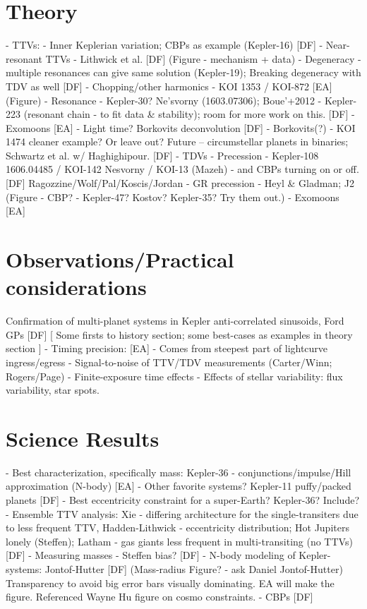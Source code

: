 \documentclass[graybox,natbib,nosecnum]{svmult}
\begin{document}
\section{Theory} %
  - TTVs:
    - Inner Keplerian variation;  CBPs as example (Kepler-16) [DF]
    - Near-resonant TTVs - Lithwick et al.  [DF] (Figure - mechanism + data)
       - Degeneracy - multiple resonances can give same solution (Kepler-19); Breaking degeneracy with TDV as well [DF]
    - Chopping/other harmonics - KOI 1353 / KOI-872 [EA] (Figure)
    - Resonance - Kepler-30?  Ne'svorny (1603.07306); Boue'+2012 - Kepler-223 (resonant chain - to fit data \& stability); room for more work on this.  [DF]
    - Exomoons [EA]
    - Light time?  Borkovits deconvolution [DF]
    - Borkovits(?) - KOI 1474 {cleaner example?  Or leave out?  Future -- circumstellar planets in binaries; Schwartz et al. w/ Haghighipour.} [DF]     - TDVs
       - Precession - Kepler-108 {1606.04485} / KOI-142 {Nesvorny} / KOI-13 (Mazeh) - and CBPs turning on or off.  [DF]  Ragozzine/Wolf/Pal/Koscis/Jordan - GR precession - Heyl \& Gladman; J2  (Figure - CBP? - Kepler-47? Kostov? Kepler-35? Try them out.)
    - Exomoons [EA]

\section{Observations/Practical considerations} %
Confirmation of multi-planet systems in Kepler anti-correlated sinusoids, Ford GPs [DF]
  [ Some firsts to history section; some best-cases as examples in theory section ]
  - Timing precision: [EA]
     - Comes from steepest part of lightcurve ingress/egress
     - Signal-to-noise of TTV/TDV measurements (Carter/Winn; Rogers/Page)
     - Finite-exposure time effects
     - Effects of stellar variability: flux variability, star spots.

\section{Science Results}
    - Best characterization, specifically mass: Kepler-36 - conjunctions/impulse/Hill approximation (N-body) [EA]
    - Other favorite systems? Kepler-11 puffy/packed planets  [DF]
    - Best eccentricity constraint for a super-Earth?  Kepler-36? Include? 
    - Ensemble TTV analysis: Xie - differing architecture for the single-transiters due to less frequent TTV, Hadden-Lithwick - eccentricity distribution; Hot Jupiters lonely (Steffen); Latham     - gas giants less frequent in multi-transiting (no TTVs)  [DF]
    - Measuring masses - Steffen bias?    [DF]
    - N-body modeling of Kepler-systems: Jontof-Hutter  [DF] (Mass-radius Figure? - ask Daniel Jontof-Hutter)  Transparency to avoid big error bars visually dominating.  EA will make the figure.  Referenced Wayne Hu figure on cosmo constraints.
    - CBPs   [DF]
\end{document}
